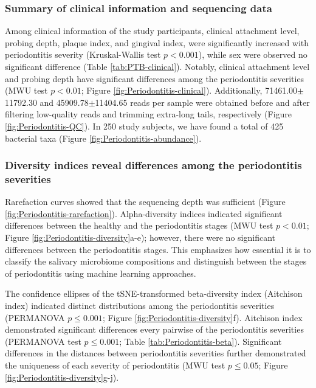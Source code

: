 \documentclass[11pt, a4paper, onecolumn, oneside]{report}
\begin{document}
            \subsubsection{Summary of  clinical information and sequencing data}
                Among clinical information of the study participants, clinical attachment level, probing depth, plaque index, and gingival index, were significantly increased with periodontitis severity (Kruskal-Wallis test $p < 0.001$), while sex were observed no significant difference (Table \ref{tab:PTB-clinical}). Notably, clinical attachment level and probing depth have significant differences among the periodontitis severities (MWU test $p < 0.01$; Figure \ref{fig:Periodontitis-clinical}). Additionally, 71461.00$\pm$11792.30 and 45909.78$\pm$11404.65 reads per sample were obtained before and after filtering low-quality reads and trimming extra-long tails, respectively (Figure \ref{fig:Periodontitis-QC}). In 250 study subjects, we have found a total of 425 bacterial taxa (Figure \ref{fig:Periodontitis-abundance}).

            \subsubsection{Diversity indices reveal differences among the periodontitis severities}
                Rarefaction curves showed that the sequencing depth was sufficient (Figure \ref{fig:Periodontitis-rarefaction}). Alpha-diversity indices indicated significant differences between the healthy and the periodontitis stages (MWU test $p < 0.01$; Figure \ref{fig:Periodontitis-diversity}a-e); however, there were no significant differences between the periodontitis stages. This emphasizes how essential it is to classify the salivary microbiome compositions and distinguish between the stages of periodontitis using machine learning approaches.

                The confidence ellipses of the tSNE-transformed beta-diversity index (Aitchison index) indicated distinct distributions among the periodontitis severities (PERMANOVA $p \le 0.001$; Figure \ref{fig:Periodontitis-diversity}f). Aitchison index demonstrated significant differences every pairwise of the periodontitis severities (PERMANOVA test $p \le 0.001$; Table \ref{tab:Periodontitis-beta}). Significant differences in the distances between periodontitis severities further demonstrated the uniqueness of each severity of periodontitis (MWU test $p \le 0.05$; Figure \ref{fig:Periodontitis-diversity}g-j).
\end{document}
